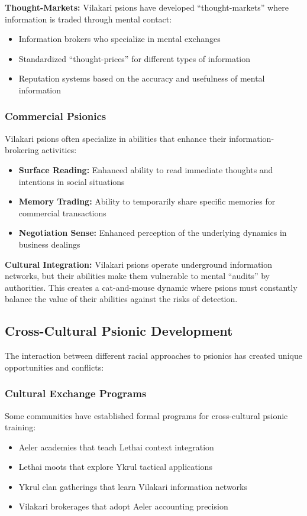 \documentclass[11pt,twoside]{article}
\begin{document}
\textbf{Thought-Markets:} Vilakari psions have developed ``thought-markets'' where information is traded through mental contact:
\begin{itemize}
    \item Information brokers who specialize in mental exchanges
    \item Standardized ``thought-prices'' for different types of information
    \item Reputation systems based on the accuracy and usefulness of mental information
\end{itemize}

\subsubsection{Commercial Psionics}
Vilakari psions often specialize in abilities that enhance their information-brokering activities:
\begin{itemize}
    \item \textbf{Surface Reading:} Enhanced ability to read immediate thoughts and intentions in social situations
    \item \textbf{Memory Trading:} Ability to temporarily share specific memories for commercial transactions
    \item \textbf{Negotiation Sense:} Enhanced perception of the underlying dynamics in business dealings
\end{itemize}

\textbf{Cultural Integration:} Vilakari psions operate underground information networks, but their abilities make them vulnerable to mental ``audits'' by authorities. This creates a cat-and-mouse dynamic where psions must constantly balance the value of their abilities against the risks of detection.

\subsection{Cross-Cultural Psionic Development}

The interaction between different racial approaches to psionics has created unique opportunities and conflicts:

\subsubsection{Cultural Exchange Programs}
Some communities have established formal programs for cross-cultural psionic training:
\begin{itemize}
    \item Aeler academies that teach Lethai context integration
    \item Lethai moots that explore Ykrul tactical applications
    \item Ykrul clan gatherings that learn Vilakari information networks
    \item Vilakari brokerages that adopt Aeler accounting precision
\end{itemize}
\end{document}

